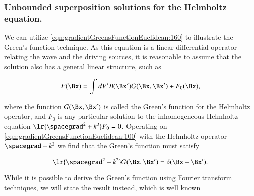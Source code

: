 %
%
\subsubsection{Unbounded superposition solutions for the Helmholtz equation.}

We can utilize \cref{eqn:gradientGreensFunctionEuclidean:160} to illustrate the Green's function technique.
As this equation is a linear differential operator relating the wave and the driving sources,
it is reasonable to assume that the solution also has a general linear structure, such as

\begin{dmath}\label{eqn:gradientGreensFunctionEuclidean:100}
F(\Bx) = \int dV' B(\Bx') G(\Bx, \Bx') + F_0(\Bx),
\end{dmath}

where the function \( G(\Bx, \Bx') \) is called the Green's function for the Helmholtz operator, and \( F_0 \) is any particular solution to the inhomogeneous Helmholtz equation \( \lr{ \spacegrad^2 + k^2 } F_0 = 0 \).
Operating on \cref{eqn:gradientGreensFunctionEuclidean:100} with the Helmholtz operator \( \spacegrad + k^2 \) we find that the Green's function must
satisfy

\begin{dmath}\label{eqn:gradientGreensFunctionEuclidean:140}
\lr{ \spacegrad^2 + k^2 } G(\Bx, \Bx') = \delta(\Bx - \Bx').
\end{dmath}

While it is possible \citep{schwinger1998classical} to derive the Green's function using Fourier transform techniques, we will state the result instead, which is well known



